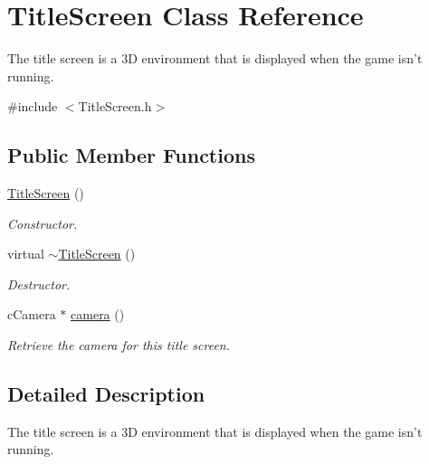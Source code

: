 \hypertarget{classTitleScreen}{
\section{TitleScreen Class Reference}
\label{classTitleScreen}
}


The title screen is a 3D environment that is displayed when the game isn't running.  




{\ttfamily \#include $<$TitleScreen.h$>$}

\subsection*{Public Member Functions}
\begin{DoxyCompactItemize}
\item 
\hypertarget{classTitleScreen_a7aa7add9040c34b655bcde4cd6e758f2}{
\hyperlink{classTitleScreen_a7aa7add9040c34b655bcde4cd6e758f2}{TitleScreen} ()}
\label{classTitleScreen_a7aa7add9040c34b655bcde4cd6e758f2}

\begin{DoxyCompactList}\small\item\em Constructor. \item\end{DoxyCompactList}\item 
\hypertarget{classTitleScreen_a4f844eb163acc5b2373f6330b37673c1}{
virtual \hyperlink{classTitleScreen_a4f844eb163acc5b2373f6330b37673c1}{$\sim$TitleScreen} ()}
\label{classTitleScreen_a4f844eb163acc5b2373f6330b37673c1}

\begin{DoxyCompactList}\small\item\em Destructor. \item\end{DoxyCompactList}\item 
cCamera $\ast$ \hyperlink{classTitleScreen_aafaa452d86899a0fa60405fa1b82754e}{camera} ()
\begin{DoxyCompactList}\small\item\em Retrieve the camera for this title screen. \item\end{DoxyCompactList}\end{DoxyCompactItemize}


\subsection{Detailed Description}
The title screen is a 3D environment that is displayed when the game isn't running. 

